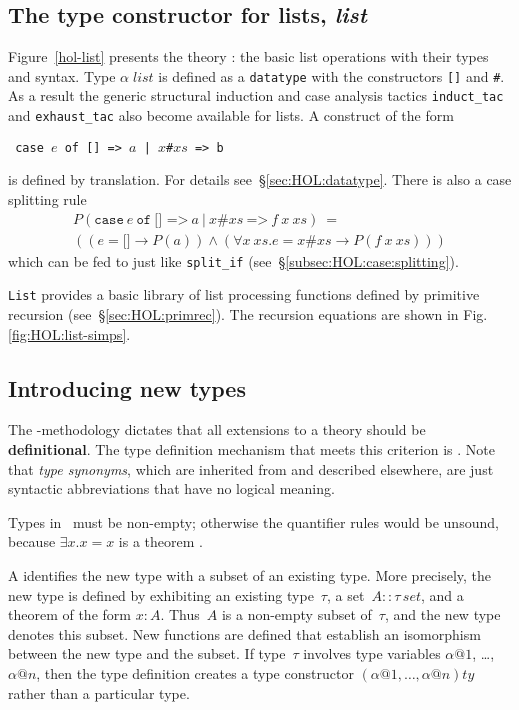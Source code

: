 \subsection{The type constructor for lists, \textit{list}}
\label{subsec:list}

Figure~\ref{hol-list} presents the theory : the basic list
operations with their types and syntax.  Type $\alpha \; list$ is
defined as a \texttt{datatype} with the constructors {\tt[]} and {\tt\#}.
As a result the generic structural induction and case analysis tactics
\texttt{induct\_tac} and \texttt{exhaust\_tac} also become available for
lists.  A  construct of the form
\begin{center}\tt
case $e$ of [] => $a$  |  \(x\)\#\(xs\) => b
\end{center}
is defined by translation.  For details see~\S\ref{sec:HOL:datatype}. There
is also a case splitting rule 
\[
\begin{array}{l}
P(\mathtt{case}~e~\mathtt{of}~\texttt{[] =>}~a ~\texttt{|}~
               x\texttt{\#}xs~\texttt{=>}~f~x~xs) ~= \\
((e = \texttt{[]} \to P(a)) \land
 (\forall x~ xs. e = x\texttt{\#}xs \to P(f~x~xs)))
\end{array}
\]
which can be fed to  just like
\texttt{split_if} (see~\S\ref{subsec:HOL:case:splitting}).

{\tt List} provides a basic library of list processing functions defined by
primitive recursion (see~\S\ref{sec:HOL:primrec}).  The recursion equations
are shown in Fig.\ts\ref{fig:HOL:list-simps}.



\subsection{Introducing new types} \label{sec:typedef}

The \HOL-methodology dictates that all extensions to a theory should
be \textbf{definitional}.  The type definition mechanism that
meets this criterion is .  Note that \emph{type synonyms},
which are inherited from {\Pure} and described elsewhere, are just
syntactic abbreviations that have no logical meaning.

\begin{warn}
  Types in \HOL\ must be non-empty; otherwise the quantifier rules would be
  unsound, because $\exists x. x=x$ is a theorem \cite[\S7]{paulson-COLOG}.
\end{warn}
A  identifies the new type with a subset of
an existing type.  More precisely, the new type is defined by
exhibiting an existing type~$\tau$, a set~$A::\tau\,set$, and a
theorem of the form $x:A$.  Thus~$A$ is a non-empty subset of~$\tau$,
and the new type denotes this subset.  New functions are defined that
establish an isomorphism between the new type and the subset.  If
type~$\tau$ involves type variables $\alpha@1$, \ldots, $\alpha@n$,
then the type definition creates a type constructor
$(\alpha@1,\ldots,\alpha@n)ty$ rather than a particular type.

